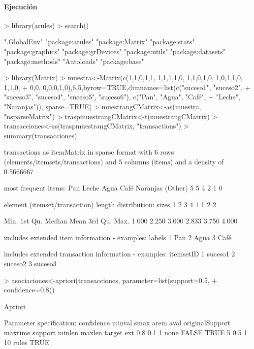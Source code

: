 \documentclass[a4paper, 12pt]{article}
\begin{document}
	\paragraph{Ejecución}
\begin{Schunk}
\begin{Sinput}
> library(arules)
> search()
\end{Sinput}
\begin{Soutput}
 [1] ".GlobalEnv"        "package:arules"    "package:Matrix"    "package:stats"     "package:graphics"  "package:grDevices" "package:utils"     "package:datasets"  "package:methods"   "Autoloads"         "package:base"     
\end{Soutput}
\begin{Sinput}
> library(Matrix)
> muestra<-Matrix(c(1,1,0,1,1, 1,1,1,1,0, 1,1,0,1,0, 1,0,1,1,0, 1,1,0,
+ 0,0, 0,0,0,1,0),6,5,byrow=TRUE,dimnames=list(c("suceso1", "suceso2",
+ "suceso3", "suceso4", "suceso5", "suceso6"), c("Pan", "Agua", "Café",
+ "Leche", "Naranjas")), sparse=TRUE)
> muestrangCMatrix<-as(muestra, "nsparseMatrix")
> traspmuestrangCMatrix<-t(muestrangCMatrix)
> transacciones<-as(traspmuestrangCMatrix, "transactions")
> summary(transacciones)
\end{Sinput}
\begin{Soutput}
transactions as itemMatrix in sparse format with
 6 rows (elements/itemsets/transactions) and
 5 columns (items) and a density of 0.5666667 

most frequent items:
     Pan    Leche     Agua     Café Naranjas  (Other) 
       5        5        4        2        1        0 

element (itemset/transaction) length distribution:
sizes
1 2 3 4 
1 1 2 2 

   Min. 1st Qu.  Median    Mean 3rd Qu.    Max. 
  1.000   2.250   3.000   2.833   3.750   4.000 

includes extended item information - examples:
  labels
1    Pan
2   Agua
3   Café

includes extended transaction information - examples:
  itemsetID
1   suceso1
2   suceso2
3   suceso3
\end{Soutput}
\begin{Sinput}
> asociaciones<-apriori(transacciones, parameter=list(support=0.5,
+ confidence=0.8))
\end{Sinput}
\begin{Soutput}
Apriori

Parameter specification:
 confidence minval smax arem  aval originalSupport maxtime support minlen maxlen target  ext
        0.8    0.1    1 none FALSE            TRUE       5     0.5      1     10  rules TRUE


\end{Soutput}
\end{Schunk}
\end{document}
